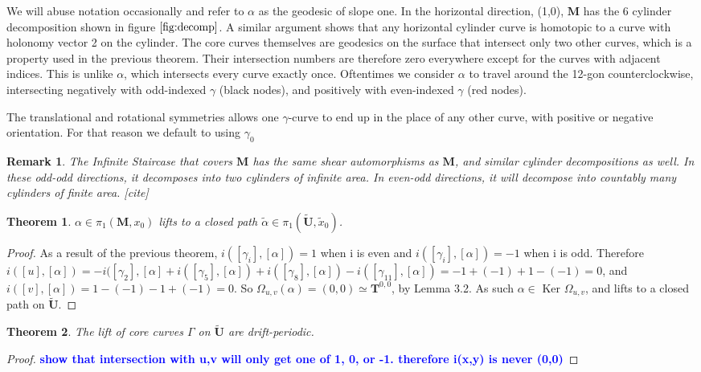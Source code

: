 \documentclass[]{article}
\newtheorem{thm}{Theorem}[section]
\newtheorem*{rem}{Remark}
\newcommand{\compav}[1]{\textbf{\textcolor{blue}{#1}}}
\begin{document}
We will abuse notation occasionally and refer to $\alpha$ as the geodesic of slope one. In the horizontal direction, (1,0), $\mathbf{M}$ has the 6 cylinder decomposition shown in figure $\ref{fig:decomp}$. A similar argument shows that any horizontal cylinder curve is homotopic to a curve with holonomy vector 2 on the cylinder. The core curves themselves are geodesics on the surface that intersect only two other curves, which is a property used in the previous theorem. Their intersection numbers are therefore zero everywhere except for the curves with adjacent indices. This is unlike $\alpha$, which intersects every curve exactly once. Oftentimes we consider $\alpha$ to travel around the 12-gon counterclockwise, intersecting negatively with odd-indexed $\gamma$ (black nodes), and positively with even-indexed $\gamma$ (red nodes).

The translational and rotational symmetries allows one $\gamma$-curve to end up in the place of any other curve, with positive or negative orientation. For that reason we default to using $\gamma_0$

\begin{rem}
The Infinite Staircase that covers $\mathbf{M}$ has the same shear automorphisms as $\mathbf{M}$, and similar cylinder decompositions as well. In these odd-odd directions, it decomposes into two cylinders of infinite area. In even-odd directions, it will decompose into countably many cylinders of finite area. [cite]
\end{rem}

\begin{thm}
$\alpha\in\pi_1(\mathbf{M}, x_0)$ lifts to a closed path $\tilde{\alpha}\in\pi_1(\tilde{\mathbf{U}},\tilde{x}_0)$.
\end{thm}
\begin{proof}
As a result of the previous theorem, $i([\gamma_i],[\alpha])=1$ when i is even and $i([\gamma_i],[\alpha])=-1$ when i is odd. Therefore $i([u],[\alpha])=-i([\gamma_2],[\alpha] +i([\gamma_5],[\alpha]) + i([\gamma_8],[\alpha]) - i([\gamma_{11}],[\alpha])=-1+(-1)+1-(-1)=0$, and $i([v],[\alpha])=1-(-1)-1+(-1)=0$. So $\Omega_{u,v}(\alpha)=(0,0)\simeq \mathbf{T}^{0,0}$, by Lemma 3.2. As such $\alpha\in$ Ker $\Omega_{u,v}$, and lifts to a closed path on $\tilde{\mathbf{U}}$.
\end{proof}

\begin{thm}
The lift of core curves $\Gamma$ on $\tilde{\mathbf{U}}$ are drift-periodic.
\end{thm}
\begin{proof}
\compav{show that intersection with u,v will only get one of 1, 0, or -1. therefore i(x,y) is never (0,0)}
\end{proof}
\end{document}
